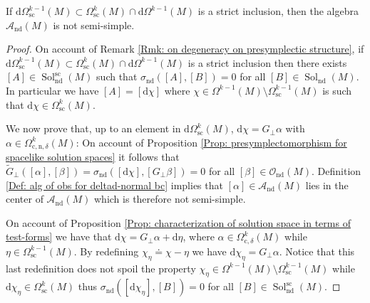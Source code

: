 \begin{corollary}\label{Cor: non-semi simple alg for deltad-normal bc}
	If $\mathrm{d}\Omega_{\mathrm{sc}}^{k-1}(M)\subset\Omega_{\mathrm{sc}}^k(M)\cap\mathrm{d}\Omega^{k-1}(M)$ is a strict inclusion, then the algebra $\mathcal{A}_{\mathrm{nd}}(M)$ is not semi-simple.
\end{corollary}
\begin{proof}
	On account of Remark \ref{Rmk: on degeneracy on presymplectic structure}, if $\mathrm{d}\Omega_{\mathrm{sc}}^{k-1}(M)\subset\Omega_{\mathrm{sc}}^k(M)\cap\mathrm{d}\Omega^{k-1}(M)$ is a strict inclusion then there exists $[A]\in\operatorname{Sol}_{\mathrm{nd}}^{\mathrm{sc}}(M)$ such that $\sigma_{\mathrm{nd}}([A],[B])=0$ for all $[B]\in\operatorname{Sol}_{\mathrm{nd}}(M)$.
	In particular we have $[A]=[\mathrm{d}\chi]$ where $\chi\in\Omega^{k-1}(M)\setminus\Omega_{\mathrm{sc}}^{k-1}(M)$ is such that $\mathrm{d}\chi\in\Omega_{\mathrm{sc}}^k(M)$.
	
	We now prove that, up to an element in $\mathrm{d}\Omega_{\mathrm{sc}}^k(M)$, $\mathrm{d}\chi=G_\perp\alpha$ with $\alpha\in\Omega_{\mathrm{c,n,}\delta}^k(M)$: On account of Proposition \ref{Prop: presymplectomorphism for spacelike solution spaces} it follows that $\widetilde{G}_\perp([\alpha],[\beta])=\sigma_{\mathrm{nd}}([\mathrm{d}\chi],[G_\perp\beta])=0$ for all $[\beta]\in\mathcal{O}_{\mathrm{nd}}(M)$.
	Definition \ref{Def: alg of obs for deltad-normal bc} implies that $[\alpha]\in\mathcal{A}_{\mathrm{nd}}(M)$ lies in the center of $\mathcal{A}_{\mathrm{nd}}(M)$ which is therefore not semi-simple.
	
	On account of Proposition \ref{Prop: characterization of solution space in terms of test-forms} we have that $\mathrm{d}\chi=G_\perp\alpha+\mathrm{d}\eta$, where $\alpha\in\Omega_{\mathrm{c},\delta}^k(M)$ while $\eta\in\Omega_{\mathrm{sc}}^{k-1}(M)$.
	By redefining $\chi_\eta\doteq\chi-\eta$ we have $\mathrm{d}\chi_\eta=G_\perp\alpha$.
	Notice that this last redefinition does not spoil the property $\chi_\eta\in\Omega^{k-1}(M)\setminus\Omega_{\mathrm{sc}}^{k-1}(M)$ while $\mathrm{d}\chi_\eta\in\Omega_{\mathrm{sc}}^k(M)$ thus $\sigma_{\mathrm{nd}}([\mathrm{d}\chi_\eta],[B])=0$ for all $[B]\in\operatorname{Sol}_{\mathrm{nd}}^{\mathrm{sc}}(M)$.
	

\end{proof}
